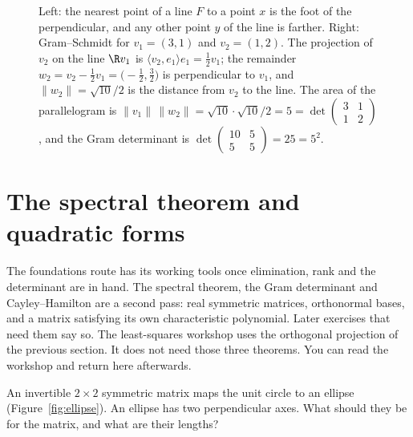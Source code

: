 \begin{figure}[ht]
\centering
{}
\caption{Left: the nearest point of a line $F$ to a point $x$ is the foot of the perpendicular, and any other point $y$ of the line is farther. Right: Gram--Schmidt for $v_1=(3,1)$ and $v_2=(1,2)$. The projection of $v_2$ on the line $\R v_1$ is $\langle v_2,e_1\rangle e_1=\frac12v_1$; the remainder $w_2=v_2-\frac12v_1=\bigl(-\frac12,\frac32\bigr)$ is perpendicular to $v_1$, and $\|w_2\|=\sqrt{10}/2$ is the distance from $v_2$ to the line. The area of the parallelogram is $\|v_1\|\,\|w_2\|=\sqrt{10}\cdot\sqrt{10}/2=5=\det\begin{pmatrix}3&1\\1&2\end{pmatrix}$, and the Gram determinant is $\det\begin{pmatrix}10&5\\5&5\end{pmatrix}=25=5^2$.}
\label{fig:gramschmidt}
\end{figure}

\section{The spectral theorem and quadratic forms}

The foundations route has its working tools once elimination, rank and the determinant are in hand. The spectral theorem, the Gram determinant and Cayley--Hamilton are a second pass: real symmetric matrices, orthonormal bases, and a matrix satisfying its own characteristic polynomial. Later exercises that need them say so. The least-squares workshop uses the orthogonal projection of the previous section. It does not need those three theorems. You can read the workshop and return here afterwards.
\begin{think}
An invertible $2\times2$ symmetric matrix maps the unit circle to an ellipse (Figure~\ref{fig:ellipse}). An ellipse has two perpendicular axes. What should they be for the matrix, and what are their lengths?
\end{think}

